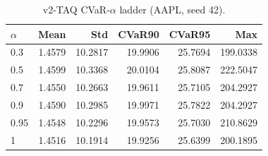 \begin{table}[H]
    \centering
    \caption{v2-TAQ CVaR-$\alpha$ ladder (AAPL, seed 42).}
    \label{tab:v2_taq_alpha}
    \begin{tabular}{@{}lrrrrr@{}}
        \toprule
        $\alpha$ & Mean & Std & CVaR90 & CVaR95 & Max \\
        \midrule
        0.3 & 1.4579 & 10.2817 & 19.9906 & 25.7694 & 199.0338 \\
        0.5 & 1.4599 & 10.3368 & 20.0104 & 25.8087 & 222.5047 \\
        0.7 & 1.4550 & 10.2663 & 19.9611 & 25.7105 & 204.2927 \\
        0.9 & 1.4590 & 10.2985 & 19.9971 & 25.7822 & 204.2927 \\
        0.95 & 1.4548 & 10.2296 & 19.9573 & 25.7030 & 210.8629 \\
        1 & 1.4516 & 10.1914 & 19.9256 & 25.6399 & 200.1895 \\
        \bottomrule
    \end{tabular}
\end{table}
